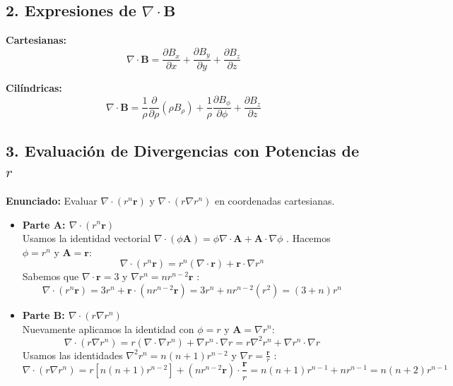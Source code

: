 \documentclass[a4paper]{article}
\begin{document}
\subsection*{2. Expresiones de $\nabla \cdot \mathbf{B}$}
\textbf{Cartesianas:}
\begin{equation}
    \nabla \cdot \mathbf{B} = \frac{\partial B_x}{\partial x} + \frac{\partial B_y}{\partial y} + \frac{\partial B_z}{\partial z}
\end{equation}

\textbf{Cilíndricas:}
\begin{equation}
    \nabla \cdot \mathbf{B} = \frac{1}{\rho} \frac{\partial}{\partial \rho}(\rho B_\rho) + \frac{1}{\rho} \frac{\partial B_\phi}{\partial \phi} + \frac{\partial B_z}{\partial z}
\end{equation}

\subsection*{3. Evaluación de Divergencias con Potencias de $r$}
\textbf{Enunciado:} Evaluar $\nabla \cdot (r^n \mathbf{r})$ y $\nabla \cdot (r \nabla r^n)$ en coordenadas cartesianas.

\begin{itemize}
    \item \textbf{Parte A: $\nabla \cdot (r^n \mathbf{r})$} \\
    Usamos la identidad vectorial $\nabla \cdot (\phi \mathbf{A}) = \phi \nabla \cdot \mathbf{A} + \mathbf{A} \cdot \nabla \phi$ \cite{90}. 
    Hacemos $\phi = r^n$ y $\mathbf{A} = \mathbf{r}$:
    \begin{equation*}
        \nabla \cdot (r^n \mathbf{r}) = r^n (\nabla \cdot \mathbf{r}) + \mathbf{r} \cdot \nabla r^n
    \end{equation*}
    Sabemos que $\nabla \cdot \mathbf{r} = 3$ y $\nabla r^n = n r^{n-2} \mathbf{r}$ \cite{109}:
    \begin{equation*}
        \nabla \cdot (r^n \mathbf{r}) = 3r^n + \mathbf{r} \cdot (n r^{n-2} \mathbf{r}) = 3r^n + n r^{n-2} (r^2) = (3+n)r^n
    \end{equation*}

    \item \textbf{Parte B: $\nabla \cdot (r \nabla r^n)$} \\
    Nuevamente aplicamos la identidad con $\phi = r$ y $\mathbf{A} = \nabla r^n$:
    \begin{equation*}
        \nabla \cdot (r \nabla r^n) = r (\nabla \cdot \nabla r^n) + \nabla r^n \cdot \nabla r = r \nabla^2 r^n + \nabla r^n \cdot \nabla r
    \end{equation*}
    Usamos las identidades $\nabla^2 r^n = n(n+1)r^{n-2}$ \cite{110} y $\nabla r = \frac{\mathbf{r}}{r}$ \cite{192}:
    \begin{equation*}
        \nabla \cdot (r \nabla r^n) = r [n(n+1)r^{n-2}] + (n r^{n-2} \mathbf{r}) \cdot \frac{\mathbf{r}}{r} = n(n+1)r^{n-1} + n r^{n-1} = n(n+2)r^{n-1}
    \end{equation*}
\end{itemize}
\end{document}
